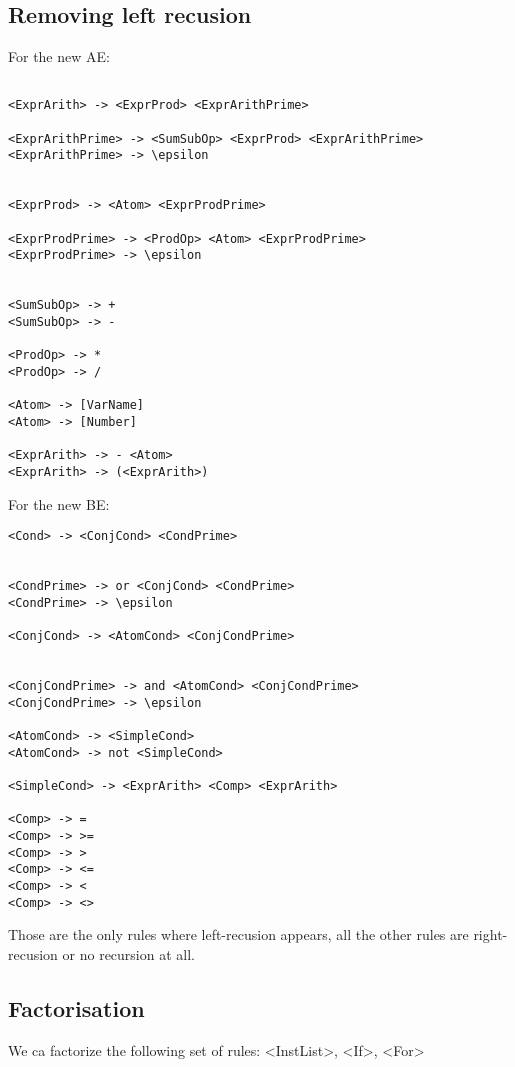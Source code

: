 \documentclass[letterpaper]{article}
\begin{document}
\subsection{Removing left recusion}

For the new AE:

\begin{lstlisting}

<ExprArith> -> <ExprProd> <ExprArithPrime>

<ExprArithPrime> -> <SumSubOp> <ExprProd> <ExprArithPrime>
<ExprArithPrime> -> \epsilon


<ExprProd> -> <Atom> <ExprProdPrime>

<ExprProdPrime> -> <ProdOp> <Atom> <ExprProdPrime>
<ExprProdPrime> -> \epsilon


<SumSubOp> -> +
<SumSubOp> -> -

<ProdOp> -> *
<ProdOp> -> /

<Atom> -> [VarName]
<Atom> -> [Number]

<ExprArith> -> - <Atom>
<ExprArith> -> (<ExprArith>)

\end{lstlisting}


For the new BE:

\begin{lstlisting}
<Cond> -> <ConjCond> <CondPrime>


<CondPrime> -> or <ConjCond> <CondPrime>
<CondPrime> -> \epsilon

<ConjCond> -> <AtomCond> <ConjCondPrime>


<ConjCondPrime> -> and <AtomCond> <ConjCondPrime>
<ConjCondPrime> -> \epsilon

<AtomCond> -> <SimpleCond>
<AtomCond> -> not <SimpleCond>

<SimpleCond> -> <ExprArith> <Comp> <ExprArith>

<Comp> -> =
<Comp> -> >=
<Comp> -> >
<Comp> -> <=
<Comp> -> <
<Comp> -> <>

\end{lstlisting}

Those are the only rules where left-recusion appears, all the other rules
are right-recusion or no recursion at all.

\subsection{Factorisation}

We ca factorize the following set of rules: <InstList>, <If>, <For>
\end{document}
